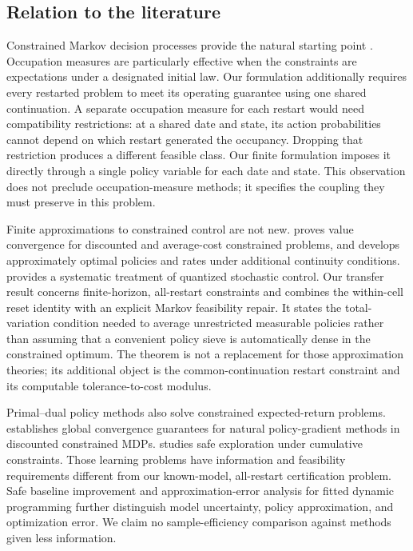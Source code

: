 \subsection{Relation to the literature}\label{sec:literature}
Constrained Markov decision processes provide the natural starting point \citep{Altman1999}. Occupation measures are particularly effective when the constraints are expectations under a designated initial law. Our formulation additionally requires every restarted problem to meet its operating guarantee using one shared continuation. A separate occupation measure for each restart would need compatibility restrictions: at a shared date and state, its action probabilities cannot depend on which restart generated the occupancy. Dropping that restriction produces a different feasible class. Our finite formulation imposes it directly through a single policy variable for each date and state. This observation does not preclude occupation-measure methods; it specifies the coupling they must preserve in this problem.

Finite approximations to constrained control are not new. \citet{Saldi2018} proves value convergence for discounted and average-cost constrained problems, and develops approximately optimal policies and rates under additional continuity conditions. \citet{SaldiLinderYuksel2018} provides a systematic treatment of quantized stochastic control. Our transfer result concerns finite-horizon, all-restart constraints and combines the within-cell reset identity with an explicit Markov feasibility repair. It states the total-variation condition needed to average unrestricted measurable policies rather than assuming that a convenient policy sieve is automatically dense in the constrained optimum. The theorem is not a replacement for those approximation theories; its additional object is the common-continuation restart constraint and its computable tolerance-to-cost modulus.

Primal--dual policy methods also solve constrained expected-return problems. \citet{DingEtAl2020} establishes global convergence guarantees for natural policy-gradient methods in discounted constrained MDPs. \citet{NiKamgarpour2025} studies safe exploration under cumulative constraints. Those learning problems have information and feasibility requirements different from our known-model, all-restart certification problem. Safe baseline improvement \citep{Laroche2019} and approximation-error analysis for fitted dynamic programming \citep{MunosSzepesvari2008,Scherrer2013} further distinguish model uncertainty, policy approximation, and optimization error. We claim no sample-efficiency comparison against methods given less information.

